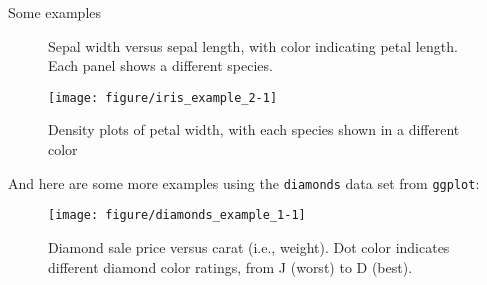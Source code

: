 \documentclass[capfont, final]{beamer}\usepackage[]{graphicx}\usepackage[]{color}
\newenvironment{knitrout}{}{} %
\newlength{\twocolwid}
\begin{document}
\begin{frame}[t, fragile]
\begin{columns}[T]
\begin{column}{\twocolwid}
\begin{block}{Some examples}
\begin{figure}
\begin{knitrout}
\end{knitrout}
\caption{Sepal width versus sepal length, with color indicating petal length. Each panel shows a different species.}
\label{fig:iris_example_1}
\end{figure}

\begin{figure}
\begin{knitrout}
\color{fgcolor}
\texttt{[image: figure/iris\_example\_2-1]} 

\end{knitrout}
\caption{Density plots of petal width, with each species shown in a different color}
\label{fig:iris_example_2}
\end{figure}

And here are some more examples using the \texttt{diamonds} data set from \texttt{ggplot}:

\begin{figure}
\begin{knitrout}
\color{fgcolor}
\texttt{[image: figure/diamonds\_example\_1-1]} 

\end{knitrout}
\caption{Diamond sale price versus carat (i.e., weight). Dot color indicates different diamond color ratings, from J (worst) to D (best).}
\label{fig:diamonds_example_1}
\end{figure}


\end{block}
\end{column}
\end{columns}
\end{frame}
\end{document}
